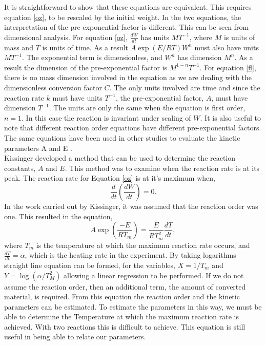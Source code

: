 It is straightforward to show that these equations are equivalent. This requires equation \eqref{oz}, to be rescaled by the initial weight. In the two equations, the interpretation of the pre-exponential factor is different. This can be seen from dimensional analysis. For equation \eqref{oz}, $\frac{dW}{dt}$ has units $MT^{-1}$, where $M$ is units of mass and $T$ is units of time. As a result $A\exp(E/RT)W^n$ must also have units $MT^{-1}$. The exponential term is dimensionless, and $W^n$ has dimension $M^n$. As a result the dimension of the pre-exponential factor is $M^{1-n}T^{-1}$. For equation \eqref{fl}, there is no mass dimension involved in the equation as we are dealing with the dimensionless conversion factor $C$. The only units involved are time and since the reaction rate $k$ must have units $T^{-1}$, the pre-exponential factor, $A$, must have dimension $T^{-1}$. The units are only the same when the equation is first order, $n=1$. In this case the reaction is invariant under scaling of $W$. It is also useful to note that different reaction order equations have different pre-exponential factors.
The same equations have been used in other studies to evaluate the kinetic parameters A and E \cite{carrasco93,kissinger56,sbirrazzuoli97}.\\
Kissinger \cite{kissinger56} developed a method that can be used to determine the reaction constants, $A$ and $E$. This method was to examine when the reaction rate is at its peak. The reaction rate for Equation \eqref{oz} is at it's maximum when, 
\begin{equation}
\frac{d}{dt}\left(\frac{dW}{dt}\right)=0.
\end{equation}
In the work carried out by Kissinger, it was assumed that the reaction order was one. This resulted in the equation,
\begin{equation}
A\exp\left(\frac{-E}{RT_m}\right)=\frac{E}{RT_m^2}\frac{dT}{dt},
\end{equation}
where $T_m$ is the temperature at which the maximum reaction rate occurs, and $\frac{dT}{dt}=\alpha$, which is the heating rate in the experiment. By taking logarithms straight line equation can be formed, for the variables, $X=1/T_m$ and $Y=\log\left(\alpha/T_M^2\right)$ allowing a linear regression to be performed. If we do not assume the reaction order, then an additional term, the amount of converted material, is required. From this equation the reaction order and the kinetic parameters can be estimated. To estimate the parameters in this way, we must be able to determine the Temperature at which the maximum reaction rate is achieved. With two reactions this is difficult to achieve. This equation is still useful in being able to relate our parameters.\\
